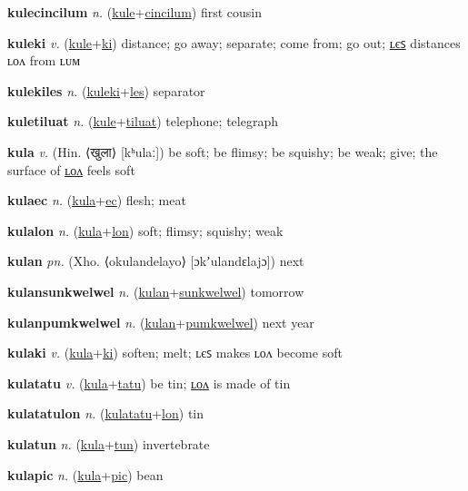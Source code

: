 \textbf{\hypertarget{kulecincilum}{kulecincilum}} \textit{n.} (\hyperlink{kule}{kule}+\allowbreak \hyperlink{cincilum}{cincilum})
first cousin

\textbf{\hypertarget{kuleki}{kuleki}} \textit{v.} (\hyperlink{kule}{kule}+\allowbreak \hyperlink{ki}{ki})
distance; go away; separate; come from; go out; \hyperlink{kulekiles}{ʟєꜱ} distances ʟᴏᴧ from ʟᴜᴍ

\textbf{\hypertarget{kulekiles}{kulekiles}} \textit{n.} (\hyperlink{kuleki}{kuleki}+\allowbreak \hyperlink{les}{les})
separator

\textbf{\hypertarget{kuletiluat}{kuletiluat}} \textit{n.} (\hyperlink{kule}{kule}+\allowbreak \hyperlink{tiluat}{tiluat})
telephone; telegraph

\textbf{\hypertarget{kula}{kula}} \textit{v.} (Hin. ⟨{\devanagari{}खुला}⟩ [kʰulaː])
be soft; be flimsy; be squishy; be weak; give; the surface of \hyperlink{kulalon}{ʟᴏᴧ} feels soft

\textbf{\hypertarget{kulaec}{kulaec}} \textit{n.} (\hyperlink{kula}{kula}+\allowbreak \hyperlink{ec}{ec})
flesh; meat

\textbf{\hypertarget{kulalon}{kulalon}} \textit{n.} (\hyperlink{kula}{kula}+\allowbreak \hyperlink{lon}{lon})
soft; flimsy; squishy; weak

\textbf{\hypertarget{kulan}{kulan}} \textit{pn.} (Xho. ⟨okulandelayo⟩ [ɔkʼulandɛlajɔ])
next

\textbf{\hypertarget{kulansunkwelwel}{kulansunkwelwel}} \textit{n.} (\hyperlink{kulan}{kulan}+\allowbreak \hyperlink{sunkwelwel}{sunkwelwel})
tomorrow

\textbf{\hypertarget{kulanpumkwelwel}{kulanpumkwelwel}} \textit{n.} (\hyperlink{kulan}{kulan}+\allowbreak \hyperlink{pumkwelwel}{pumkwelwel})
next year

\textbf{\hypertarget{kulaki}{kulaki}} \textit{v.} (\hyperlink{kula}{kula}+\allowbreak \hyperlink{ki}{ki})
soften; melt; ʟєꜱ makes ʟᴏᴧ become soft

\textbf{\hypertarget{kulatatu}{kulatatu}} \textit{v.} (\hyperlink{kula}{kula}+\allowbreak \hyperlink{tatu}{tatu})
be tin; \hyperlink{kulatatulon}{ʟᴏᴧ} is made of tin

\textbf{\hypertarget{kulatatulon}{kulatatulon}} \textit{n.} (\hyperlink{kulatatu}{kulatatu}+\allowbreak \hyperlink{lon}{lon})
tin

\textbf{\hypertarget{kulatun}{kulatun}} \textit{n.} (\hyperlink{kula}{kula}+\allowbreak \hyperlink{tun}{tun})
invertebrate

\textbf{\hypertarget{kulapic}{kulapic}} \textit{n.} (\hyperlink{kula}{kula}+\allowbreak \hyperlink{pic}{pic})
bean


